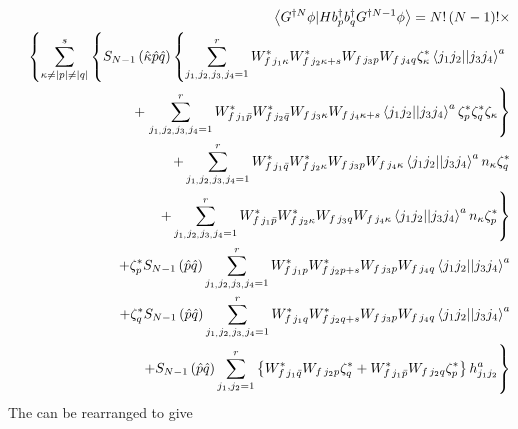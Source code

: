 \documentclass{article}
\begin{document}
\begin{eqnarray}
&&\left\langle G^{\dagger N}\phi |Hb_{p}^{\dagger }b_{q}^{\dagger
}G^{\dagger N-1}\phi \right\rangle =N!\left( N-1\right) !\times  \notag \\
&&\left\{ \sum_{\kappa \neq \left| p\right| \neq \left| q\right|
}^{s}\left\{ S_{N-1}\left( \hat{\kappa}\hat{p}\hat{q}\right) \left\{
\sum_{j_{1,}j_{2,}j_{3,}j_{4}=1}^{r}W_{f\,j_{1}\kappa }^{\ast
}W_{f\,j_{2}\kappa +s}^{\ast }W_{f\,j_{3}p}W_{f\,j_{4}q}\zeta _{\kappa
}^{\ast }\left\langle j_{1}j_{2}||j_{3}j_{4}\right\rangle ^{a}\right.
\right. \right.  \notag \\
&&\quad \qquad \quad \quad \quad \qquad +\left.
\sum_{j_{1,}j_{2,}j_{3,}j_{4}=1}^{r}W_{f\,j_{1}\bar{p}}^{\ast }W_{f\,j_{2}%
\bar{q}}^{\ast }W_{f\,j_{3}\kappa }W_{f\,j_{4}\kappa +s}\left\langle
j_{1}j_{2}||j_{3}j_{4}\right\rangle ^{a}\zeta _{p}^{\ast }\zeta _{q}^{\ast
}\zeta _{\kappa }\right\}  \notag \\
&&\qquad \qquad \quad \quad \qquad
+\sum_{j_{1,}j_{2,}j_{3,}j_{4}=1}^{r}W_{f\,j_{1}\bar{q}}^{\ast
}W_{f\,j_{2}\kappa }^{\ast }W_{f\,j_{3}p}W_{f\,j_{4}\kappa }\left\langle
j_{1}j_{2}||j_{3}j_{4}\right\rangle ^{a}n_{\kappa }\zeta _{q}^{\ast }  \notag
\\
&&\qquad \qquad \quad \quad \qquad \left.
+\sum_{j_{1,}j_{2,}j_{3,}j_{4}=1}^{r}W_{f\,j_{1}\bar{p}}^{\ast
}W_{f\,j_{2}\kappa }^{\ast }W_{f\,j_{3}q}W_{f\,j_{4}\kappa }\left\langle
j_{1}j_{2}||j_{3}j_{4}\right\rangle ^{a}n_{\kappa }\zeta _{p}^{\ast }\right\}
\notag \\
&&\qquad \qquad \quad \quad \quad +\zeta _{p}^{\ast }S_{N-1}\left( \hat{p}%
\hat{q}\right) \sum_{j_{1,}j_{2,}j_{3,}j_{4}=1}^{r}W_{f\,j_{1}p}^{\ast
}W_{f\,j_{2}p+s}^{\ast }W_{f\,j_{3}p}W_{f\,j_{4}q}\left\langle
j_{1}j_{2}||j_{3}j_{4}\right\rangle ^{a}  \notag \\
&&\qquad \qquad \quad \quad \quad +\zeta _{q}^{\ast }S_{N-1}\left( \hat{p}%
\hat{q}\right) \sum_{j_{1,}j_{2,}j_{3,}j_{4}=1}^{r}W_{f\,j_{1}q}^{\ast
}W_{f\,j_{2}q+s}^{\ast }W_{f\,j_{3}p}W_{f\,j_{4}q}\left\langle
j_{1}j_{2}||j_{3}j_{4}\right\rangle ^{a}  \notag \\
&&\qquad \quad \quad \quad \qquad \left. +S_{N-1}\left( \hat{p}\hat{q}%
\right) \sum_{j_{1},j_{2}=1}^{r}\left\{ W_{f\,j_{1}\bar{q}}^{\ast
}W_{f\,j_{2}p}\zeta _{q}^{\ast }+W_{f\,j_{1}\bar{p}}^{\ast
}W_{f\,j_{2}q}\zeta _{p}^{\ast }\right\} h_{j_{1}j_{2}}^{a}\right\}
\end{eqnarray}%
The can be rearranged to give 
\end{document}
